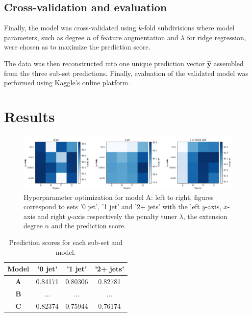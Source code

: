 \documentclass[10pt,conference,compsocconf]{IEEEtran}
\begin{document}
\subsection{Cross-validation and evaluation} %
Finally, the model was cross-validated using $k$-fold subdivisions  where model parameters, such as degree $n$ of feature augmentation and $\lambda$ for ridge regression, were chosen as to maximize the prediction score.  

The data was then reconstructed into one unique prediction vector $\mathbf{\hat{y}}$ assembled from the three sub-set predictions. Finally, evaluation of the validated model was performed using Kaggle's online platform.

\section{Results} 
\label{sec:results}

\begin{figure}
\begin{center}
\includegraphics[scale=0.235]{best_parameters.png}
\caption{Hyperparameter optimization for model A: left to right, figures correspond to sets '0 jet', '1 jet' and '2+ jets' with the left $y$-axis, $x$-axis and right $y$-axis respectively the penalty tuner $\lambda$, the extension degree $n$ and the prediction score.}
\label{param}
\end{center}
\end{figure}


\begin{table}[]
    \centering
    \caption{Prediction scores for each sub-set and model.}
    \label{tab:subset}
    \begin{tabular}{|c|c|c|c|}
    \hline
    \textbf{Model} &  '0 jet' &  '1 jet'  & '2+ jets' \\
    \hline
    \textbf{A} & 0.84171 & 0.80306 & 0.82781 \\
    \hline
    \textbf{B} & ... & ... & ... \\
    \hline
     \textbf{C} & 0.82374 & 0.75944 & 0.76174 \\
    \hline
    \end{tabular}
    \vfill
\end{table}
\end{document}
